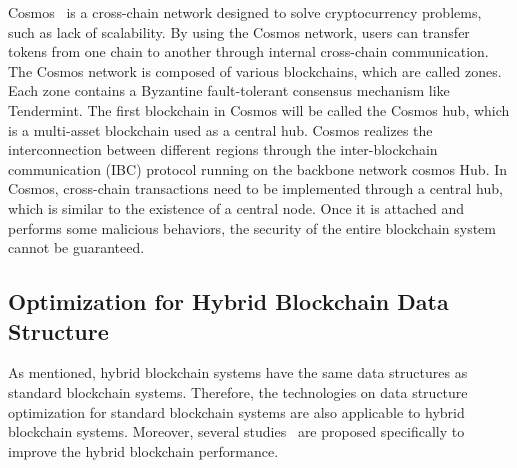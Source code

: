 \documentclass[acmsmall]{acmart}
\begin{document}
Cosmos~\cite{kwon2016cosmos} is a cross-chain network designed to solve cryptocurrency problems, such as lack of scalability. By using the Cosmos network, users can transfer tokens from one chain to another through internal cross-chain communication. The Cosmos network is composed of various blockchains, which are called zones. Each zone contains a Byzantine fault-tolerant consensus mechanism like Tendermint. The first blockchain in Cosmos will be called the Cosmos hub, which is a multi-asset blockchain used as a central hub. Cosmos realizes the interconnection between different regions through the inter-blockchain communication (IBC) protocol running on the backbone network cosmos Hub.
In Cosmos, cross-chain transactions need to be implemented through a central hub, which is similar to the existence of a central node. Once it is attached and performs some malicious behaviors, the security of the entire blockchain system cannot be guaranteed.





\subsection{Optimization for Hybrid Blockchain Data Structure}
As mentioned, hybrid blockchain systems have the same data structures as standard blockchain systems. Therefore, the technologies on data structure optimization for standard blockchain systems are also applicable to hybrid blockchain systems. Moreover, several studies~\cite{gupta2018efficiently, gupta2018building} are proposed specifically to improve the hybrid blockchain performance.
\end{document}
